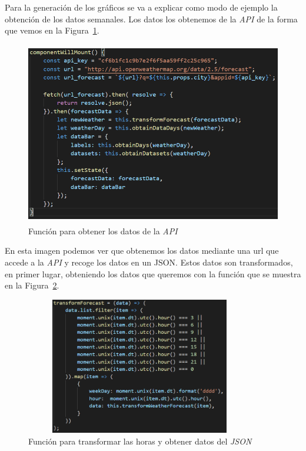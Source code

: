 \documentclass[a4paper, 12pt]{book}
\begin{document}
Para la generación de los gráficos se va a explicar como modo de ejemplo la obtención de los datos semanales. Los datos los obtenemos de la \textit{API} de la forma que vemos en la Figura~\ref{fig:api_data_week}.
\begin{figure}[h]
  \centering
  \includegraphics[width=12cm, height=8cm]{img_usadas/api_data_week.png}
  \caption{Función para obtener los datos de la \textit{API}}
  \label{fig:api_data_week}
\end{figure}

En esta imagen podemos ver que obtenemos los datos mediante una url que accede a la \textit{API} y recoge los datos en un JSON. Estos datos son transformados, en primer lugar, obteniendo los datos que queremos con la función que se muestra en la Figura~\ref{fig:transform_forecast}.
\begin{figure}[h]
  \centering
  \includegraphics[width=10cm, height=6cm]{img_usadas/transform_forecast.png}
  \caption{Función para transformar las horas y obtener datos del \textit{JSON}}
  \label{fig:transform_forecast}
\end{figure}
\end{document}
